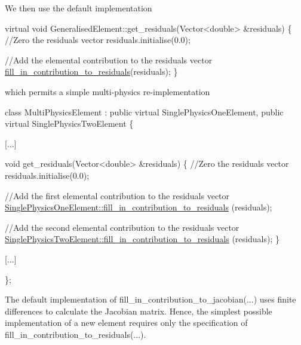 We then use the default implementation 
\begin{DoxyCode}
\textcolor{keyword}{virtual} \textcolor{keywordtype}{void} GeneralisedElement::get\_residuals(Vector<double> &residuals) 
 \{
  \textcolor{comment}{//Zero the residuals vector}
  residuals.initialise(0.0);

  \textcolor{comment}{//Add the elemental contribution to the residuals vector}
  \hyperlink{namespaceoomph_a4221193ecad909a3bf5cfcec81202e39}{fill\_in\_contribution\_to\_residuals}(residuals);
  \}
\end{DoxyCode}
 which permits a simple multi-\/physics re-\/implementation 
\begin{DoxyCode}
\textcolor{keyword}{class }MultiPhysicsElement : \textcolor{keyword}{public} \textcolor{keyword}{virtual} SinglePhysicsOneElement,
                            \textcolor{keyword}{public} \textcolor{keyword}{virtual} SinglePhysicsTwoElement
 \{   

  [...]

 \textcolor{keywordtype}{void} get\_residuals(Vector<double> &residuals) 
  \{
   \textcolor{comment}{//Zero the residuals vector}
   residuals.initialise(0.0);

   \textcolor{comment}{//Add the first elemental contribution to the residuals vector}
   \hyperlink{namespaceoomph_a4221193ecad909a3bf5cfcec81202e39}{SinglePhysicsOneElement::fill\_in\_contribution\_to\_residuals}
      (residuals);

   \textcolor{comment}{//Add the second elemental contribution to the residuals vector   }
   \hyperlink{namespaceoomph_a4221193ecad909a3bf5cfcec81202e39}{SinglePhysicsTwoElement::fill\_in\_contribution\_to\_residuals}
      (residuals); 
  \}

  [...]

\};
\end{DoxyCode}


The default implementation of {\ttfamily fill\+\_\+in\+\_\+contribution\+\_\+to\+\_\+jacobian}(...) uses finite differences to calculate the Jacobian matrix. Hence, the simplest possible implementation of a new element requires only the specification of {\ttfamily fill\+\_\+in\+\_\+contribution\+\_\+to\+\_\+residuals}(...).


